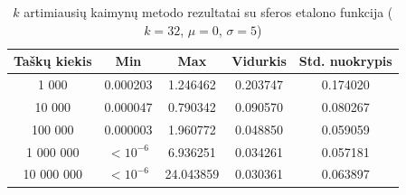 \begin{table}[H]
    \centering
    \begin{tabular}{|c|c|c|c|c|}
        \hline
        \textbf{Taškų kiekis} & \textbf{Min} & \textbf{Max} & \textbf{Vidurkis} & \textbf{Std. nuokrypis} \\ \hline
        1 000        & 0.000203 & 1.246462 & 0.203747 & 0.174020 \\ \hline
        10 000       & 0.000047 & 0.790342 & 0.090570 & 0.080267 \\ \hline
        100 000      & 0.000003 & 1.960772 & 0.048850 & 0.059059 \\ \hline
        1 000 000    & $<10^{-6}$ & 6.936251 & 0.034261 & 0.057181 \\ \hline
        10 000 000   & $<10^{-6}$ & 24.043859 & 0.030361 & 0.063897 \\ \hline
    \end{tabular}
    \caption{$k$ artimiausių kaimynų metodo rezultatai su sferos etalono funkcija ($k = 32$, $\mu = 0$, $\sigma = 5$)}
\end{table}